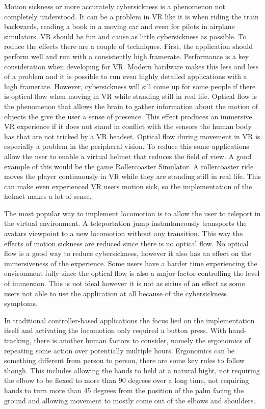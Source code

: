 Motion sickness or more accurately cybersickness is a phenomenon not completely understood. It can be a problem in VR like it is when riding the train backwards, reading a book in a moving car and even for pilots in airplane simulators. VR should be fun and cause as little cybersickness as possible. To reduce the effects there are a couple of techniques. First, the application should perform well and run with a consistently high framerate. Performance is a key consideration when developing for VR. Modern hardware makes this less and less of a problem and it is possible to run even highly detailed applications with a high framerate. However, cybersickness will sill come up for some people if there is optical flow when moving in VR while standing still in real life. Optical flow is the phenomenon that allows the brain to gather information about the motion of objects the give the user a sense of presence. This effect produces an immersive VR experience if it does not stand in conflict with the sensors the human body has that are not tricked by a VR headset. Optical flow during movement in VR is especially a problem in the peripheral vision. To reduce this some applications allow the user to enable a virtual helmet that reduces the field of view. A good example of this would be the game Rollercoaster Simulator. A rollercoaster ride moves the player continuously in VR while they are standing still in real life. This can make even experienced VR users motion sick, so the implementation of the helmet makes a lot of sense. 

The most popular way to implement locomotion is to allow the user to teleport in the virtual environment. A teleportation jump instantaneously transports the avatars viewpoint to a new locomotion without any transition. This way the effects of motion sickness are reduced since there is no optical flow. No optical flow is a good way to reduce cybersickness, however it also has an effect on the immersiveness of the experience. Some users have a harder time experiencing the environment fully since the optical flow is also a major factor controlling the level of immersion. This is not ideal however it is not as sirius of an effect as some users not able to use the application at all because of the cybersickness symptoms. 

In traditional controller-based applications the focus lied on the implementation itself and activating the locomotion only required a button press. With hand-tracking, there is another human factors to consider, namely the ergonomics of repeating some action over potentially multiple hours. Ergonomics can be something different from person to person, there are some key rules to follow though. This includes allowing the hands to held at a natural hight, not requiring the elbow to be flexed to more than 90 degrees over a long time, not requiring hands to turn more than 45 degrees from the position of the palm facing the ground and allowing movement to mostly come out of the elbows and shoulders. 



